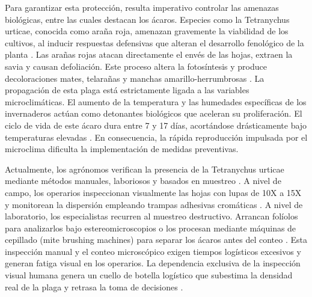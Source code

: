 \documentclass[12pt,letterpaper]{article}
\begin{document}
Para garantizar esta protección, resulta imperativo controlar las amenazas biológicas, entre las cuales destacan los ácaros. Especies como la Tetranychus urticae, conocida como araña roja, amenazan gravemente la viabilidad de los cultivos\cite{mesa2012acaros}, al inducir respuestas defensivas que alteran el desarrollo fenológico de la planta \cite{agut2015}.  Las arañas rojas atacan directamente el envés de las hojas, extraen la savia y causan defoliación. Este proceso altera la fotosíntesis y produce decoloraciones mates, telarañas y manchas amarillo-herrumbrosas \cite{gonzalezgonzalez2021}. La propagación de esta plaga está estrictamente ligada a las variables microclimáticas. El aumento de la temperatura y las humedades específicas de los invernaderos actúan como detonantes biológicos que aceleran su proliferación. El ciclo de vida de este ácaro dura entre 7 y 17 días, acortándose drásticamente bajo temperaturas elevadas \cite{praslicka2004}\cite{gva2026ivia}. En consecuencia, la rápida reproducción impulsada por el microclima dificulta la implementación de medidas preventivas.

Actualmente, los agrónomos verifican la presencia de la Tetranychus urticae mediante métodos manuales, laboriosos y basados en muestreo \cite{ucipm2023}. A nivel de campo, los operarios inspeccionan visualmente las hojas con lupas de 10X a 15X y monitorean la dispersión empleando trampas adhesivas cromáticas \cite{ucipm2023}. A nivel de laboratorio, los especialistas recurren al muestreo destructivo. Arrancan folíolos para analizarlos bajo estereomicroscopios o los procesan mediante máquinas de cepillado (mite brushing machines) para separar los ácaros antes del conteo \cite{popDensity}. Esta inspección manual y el conteo microscópico exigen tiempos logísticos excesivos y generan fatiga visual en los operarios. La 
dependencia exclusiva de la inspección visual humana genera un cuello de botella logístico que subestima la densidad real de la plaga y retrasa la toma de decisiones \cite{ucipm2023}.
\end{document}
